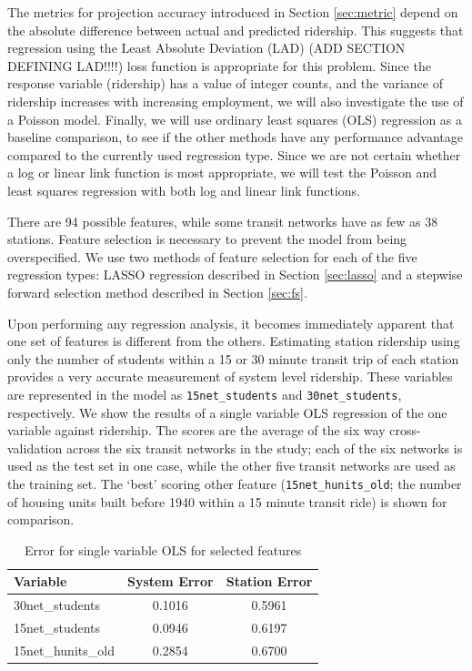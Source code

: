 \documentclass[11pt]{article}
\begin{document}
The metrics for projection accuracy introduced in Section \ref{sec:metric} depend on the absolute difference between actual and predicted ridership. This suggests that regression using the Least Absolute Deviation (LAD) (ADD SECTION DEFINING LAD!!!!) loss function is appropriate for this problem. Since the response variable (ridership) has a value of integer counts, and the variance of ridership increases with increasing employment, we will also investigate the use of a Poisson model. Finally, we will use ordinary least squares (OLS) regression as a baseline comparison, to see if the other methods have any performance advantage compared to the currently used regression type. Since we are not certain whether a log or linear link function is most appropriate, we will test the Poisson and least squares regression with both log and linear link functions.

There are 94 possible features, while some transit networks have as few as 38 stations. Feature selection is necessary to prevent the model from being overspecified. We use two methods of feature selection for each of the five regression types: LASSO regression described in Section \ref{sec:lasso} and a stepwise forward selection method described in Section \ref{sec:fs}. 

Upon performing any regression analysis, it becomes immediately apparent that one set of features is different from the others. Estimating station ridership using only the number of students within a 15 or 30 minute transit trip of each station provides a very accurate measurement of system level ridership. These variables are represented in the model as \texttt{15net\_students} and \texttt{30net\_students}, respectively. We show the results of a single variable OLS regression of the one variable against ridership. The scores are the average of the six way cross-validation across the six transit networks in the study; each of the six networks is used as the test set in one case, while the other five transit networks are used as the training set. The `best' scoring other feature (\texttt{15net\_hunits\_old}; the number of housing units built before 1940 within a 15 minute transit ride) is shown for comparison.

\begin{table}[H]
\centering
\begin{tabular}{lcc}
\toprule Variable&System Error&Station Error\\
\midrule 30net\_students&0.1016&0.5961\\
15net\_students&0.0946&0.6197\\
15net\_hunits\_old&0.2854&0.6700\\ 
\end{tabular}
\caption{Error for single variable OLS for selected features}\label{tab:students}
\end{table}
\end{document}
